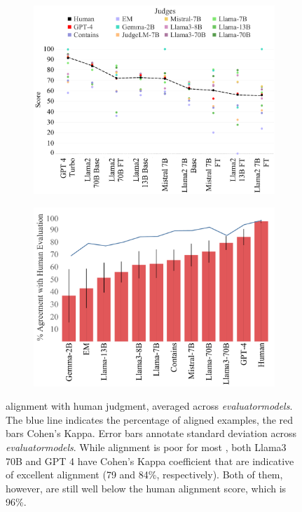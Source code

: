 \begin{figure}[h]
    \centering
    \begin{subfigure}[b]{0.49\textwidth}
        \centering
        \includegraphics[width=\linewidth]{figures/JudgeScoreforExamTakers.pdf}
        \caption{}
        \label{fig:llmalignment_a}
    \end{subfigure}
    \hfill
    \begin{subfigure}[b]{0.49\textwidth}
        \centering\includegraphics[width=\linewidth]{figures/LLMAlignmentV5.pdf}
        \caption{}
        \label{fig:assigned_scores}
    \end{subfigure}
    \caption{\Judgemodel alignment with human judgment, averaged across \textit{evaluatormodels}. The blue line indicates the percentage of aligned examples, the red bars Cohen's Kappa. 
    Error bars annotate standard deviation across \textit{evaluatormodels}. While alignment is poor for most \Judgemodel, both Llama3 70B and GPT 4 have Cohen's Kappa coefficient that are indicative of excellent alignment (79 and 84\%, respectively). Both of them, however, are still well below the human alignment score, which is 96\%.}
    \label{fig:llmalignment}
\end{figure}





